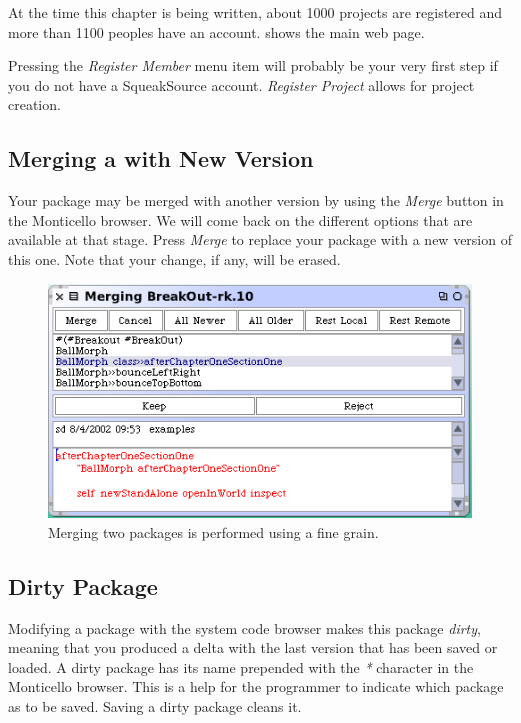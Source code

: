 \documentclass[a4paper,10pt,twoside]{book}
\begin{document}
At the time this chapter is being written, about 1000 projects are registered and more than 1100 peoples have an account.  shows the main web page.

Pressing the \emph{Register Member} menu item will probably be your very first step if you do not have a SqueakSource account. \emph{Register Project} allows for project creation. 


\subsection{Merging a with New Version}

Your package may be merged with another version by using the \emph{Merge} button in the Monticello browser. We will come back on the different options that are available at that stage. Press \emph{Merge} to replace your package with a new version of this one. Note that your change, if any, will be erased.

\begin{figure}[ht]\centering
	\includegraphics[width=.75\linewidth]{merger}
	\caption{Merging two packages is performed using a fine grain.}
\end{figure}

\subsection{Dirty Package}

Modifying a package with the system code browser makes this package \emph{dirty}, meaning that you produced a delta with the last version that has been saved or loaded. A dirty package has its name prepended with the \emph{*} character in the Monticello browser. This is a help for the programmer to indicate which package as to be saved. Saving a dirty package cleans it.


\end{document}
